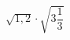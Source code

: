 \begin{ex}[type=calculate]
	\begin{condition}
		\( \sqrt{1,2}\cdot\sqrt{3\dfrac{1}{3}} \)
	\end{condition}
\end{ex}
